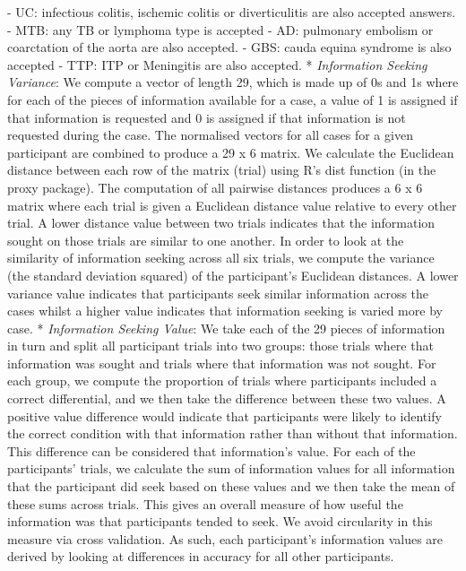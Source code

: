 \documentclass[a4paper, nobind]{templates/ociamthesis}
\begin{document}
- UC: infectious colitis, ischemic colitis or diverticulitis are also accepted answers.
- MTB: any TB or lymphoma type is accepted
- AD: pulmonary embolism or coarctation of the aorta are also accepted.
- GBS: cauda equina syndrome is also accepted
- TTP: ITP or Meningitis are also accepted.
* \emph{Information Seeking Variance}: We compute a vector of length 29, which is made up of 0s and 1s where for each of the pieces of information available for a case, a value of 1 is assigned if that information is requested and 0 is assigned if that information is not requested during the case. The normalised vectors for all cases for a given participant are combined to produce a 29 x 6 matrix. We calculate the Euclidean distance between each row of the matrix (trial) using R's dist function (in the proxy package). The computation of all pairwise distances produces a 6 x 6 matrix where each trial is given a Euclidean distance value relative to every other trial. A lower distance value between two trials indicates that the information sought on those trials are similar to one another. In order to look at the similarity of information seeking across all six trials, we compute the variance (the standard deviation squared) of the participant's Euclidean distances. A lower variance value indicates that participants seek similar information across the cases whilst a higher value indicates that information seeking is varied more by case.
* \emph{Information Seeking Value}: We take each of the 29 pieces of information in turn and split all participant trials into two groups: those trials where that information was sought and trials where that information was not sought. For each group, we compute the proportion of trials where participants included a correct differential, and we then take the difference between these two values. A positive value difference would indicate that participants were likely to identify the correct condition with that information rather than without that information. This difference can be considered that information's value. For each of the participants' trials, we calculate the sum of information values for all information that the participant did seek based on these values and we then take the mean of these sums across trials. This gives an overall measure of how useful the information was that participants tended to seek. We avoid circularity in this measure via cross validation. As such, each participant's information values are derived by looking at differences in accuracy for all other participants.
\end{document}
